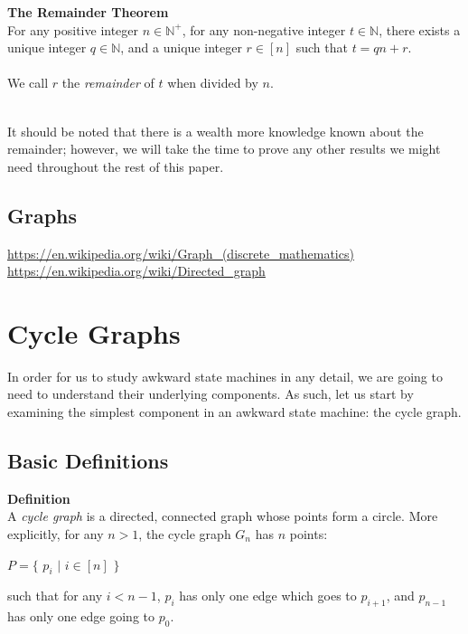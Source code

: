 \documentclass[a4paper,12pt]{article}
\begin{document}
\begin{tcolorbox}
\textbf{\hypertarget{theorem:remainder}{The Remainder Theorem}}\\
For any positive integer $n \in \mathbb{N^{+}}$, for any non-negative integer $t \in \mathbb{N}$, there exists a unique integer $q \in \mathbb{N}$, and a unique integer $r \in [n]$ such that $t = qn + r$.\\
\\
We call $r$ the \textit{remainder} of $t$ when divided by $n$.
\end{tcolorbox}
\label{theorem:remainder}
\label{definition:remainder}
\noindent
\\
It should be noted that there is a wealth more knowledge known about the remainder; however, we will take the time to prove any other results we might need throughout the rest of this paper.


\subsection{Graphs}
\url{https://en.wikipedia.org/wiki/Graph_(discrete_mathematics)}\\
\url{https://en.wikipedia.org/wiki/Directed_graph}

\section{Cycle Graphs}
\label{sec:cycle_graphs}


In order for us to study awkward state machines in any detail, we are going to need to understand their underlying components. As such, let us start by examining the simplest component in an awkward state machine: the cycle graph.



\subsection{Basic Definitions}
\label{sec:cycle_graphs_basic_definitions}

\label{definition:cycle_graph}
\begin{tcolorbox}
\textbf{Definition}\\
A \textit{cycle graph} is a directed, connected graph whose points form a circle. More explicitly, for any $n > 1$, the cycle graph $G_n$ has $n$ points:

\begin{center}
$P = \{$ $p_i$ $|$ $i \in [n]$ $\}$
\end{center}
\noindent

such that for any $i < n - 1$, $p_i$ has only one edge which goes to $p_{i + 1}$, and $p_{n-1}$ has only one edge going to $p_0$.
\end{tcolorbox}
\end{document}
